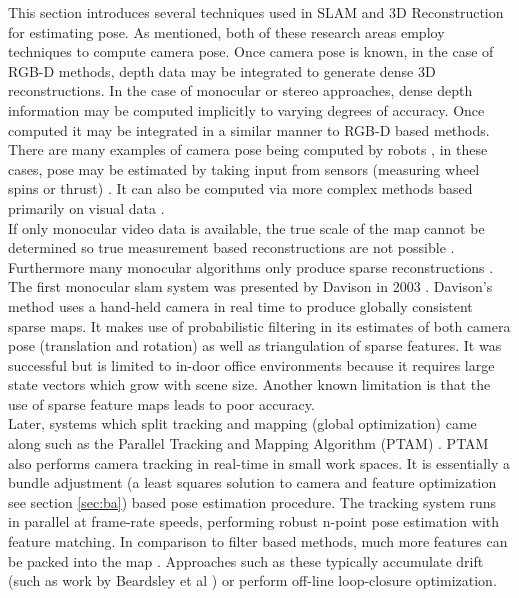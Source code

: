 
This section introduces several techniques used in SLAM and 3D Reconstruction for estimating pose. As mentioned, both of these research areas employ techniques to compute camera pose. Once camera pose is known, in the case of RGB-D methods, depth data may be integrated to generate dense 3D reconstructions. In the case of monocular or stereo approaches, dense depth information may be computed implicitly to varying degrees of accuracy. Once computed it may be integrated in a similar manner to RGB-D based methods. \\

There are many examples of camera pose being computed by robots \cite{Olson06Fast,Frese05Multilevel,Dellaert06Square,Thrun02Robotic,Nuchter056d,Grisetti07Efficient,Kaess08Isam}, in these cases, pose may be estimated by taking input from sensors (measuring wheel spins or thrust) \cite{Callieri04Roboscan}. It can also be computed via more complex methods based primarily on visual data \cite{Davison03Real,Klein07Parallel,Strasdat10Real,Jin00Real,Nister05Preemptive}. 
\\

If only monocular video data is available, the true scale of the map cannot be determined so true measurement based reconstructions are not possible \cite{Endres12Evaluation,Konolige08Outdoor, Paz08Large}. Furthermore many monocular algorithms only produce sparse reconstructions \cite{Davison03Real,Klein07Parallel}. \\

The first monocular slam system was presented by Davison in 2003 \cite{Davison03Real}. Davison's method uses a hand-held camera in real time to produce globally consistent sparse maps. It makes use of probabilistic filtering in its estimates of both camera pose (translation and rotation) as well as triangulation of sparse features. It was successful but is limited to in-door office environments because it requires large state vectors which grow with scene size. Another known limitation is that the use of sparse feature maps leads to poor accuracy. \\

Later, systems which split tracking and mapping (global optimization) came along such as the Parallel Tracking and Mapping Algorithm (PTAM) \cite{Klein07Parallel}. PTAM also performs camera tracking in real-time in small work spaces. It is essentially a bundle adjustment (a least squares solution to camera and feature optimization see section \ref{sec:ba}) based pose estimation procedure. The tracking system runs in parallel at frame-rate speeds, performing robust n-point pose estimation with feature matching. In comparison to filter based methods, much more features can be packed into the map \cite{Strasdat10Real}. Approaches such as these typically accumulate drift (such as work by Beardsley et al \cite{Beardsley97Sequential}) or perform off-line loop-closure optimization. \\

